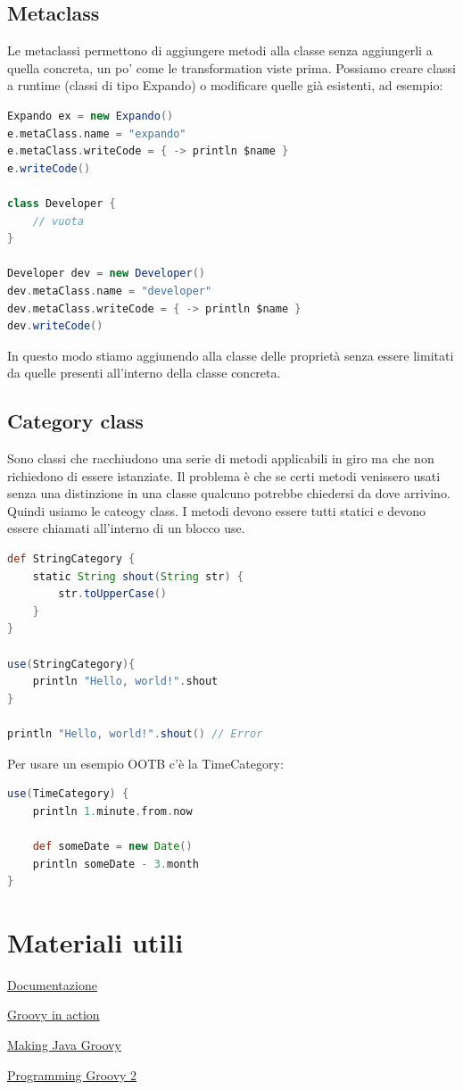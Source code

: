 \documentclass[11pt,a4paper]{book}
\begin{document}
\section{Metaclass}
Le metaclassi permettono di aggiungere metodi alla classe senza aggiungerli a quella concreta, un po' come le transformation viste prima. Possiamo creare classi a runtime (classi di tipo Expando) o modificare quelle già esistenti, ad esempio:
\begin{lstlisting}[language = groovy]
Expando ex = new Expando()
e.metaClass.name = "expando"
e.metaClass.writeCode = { -> println $name }
e.writeCode()

class Developer {
	// vuota
}

Developer dev = new Developer()
dev.metaClass.name = "developer"
dev.metaClass.writeCode = { -> println $name }
dev.writeCode()
\end{lstlisting}

In questo modo stiamo aggiunendo alla classe delle proprietà senza essere limitati da quelle presenti all'interno della classe concreta.

\section{Category class}
Sono classi che racchiudono una serie di metodi applicabili in giro ma che non richiedono di essere istanziate. Il problema è che se certi metodi venissero usati senza una distinzione in una classe qualcuno potrebbe chiedersi da dove arrivino. Quindi usiamo le cateogy class. I metodi devono essere tutti statici e devono essere chiamati all'interno di un blocco use.
\begin{lstlisting}[language = groovy]
def StringCategory {
	static String shout(String str) {
		str.toUpperCase()
	}
}

use(StringCategory){
	println "Hello, world!".shout	
}

println "Hello, world!".shout() // Error
\end{lstlisting}
Per usare un esempio OOTB c'è la TimeCategory:
\begin{lstlisting}[language = groovy]
use(TimeCategory) {
	println 1.minute.from.now
	
	def someDate = new Date()
	println someDate - 3.month
}
\end{lstlisting}

\chapter{Materiali utili}
\href{https://groovy-lang.org/}{Documentazione}

\href{https://www.manning.com/books/groovy-in-action-second-edition}{Groovy in action}

\href{https://www.manning.com/books/making-java-groovy}{Making Java Groovy}

\href{https://pragprog.com/titles/vslg2/programming-groovy-2/}{Programming Groovy 2}
\end{document}
